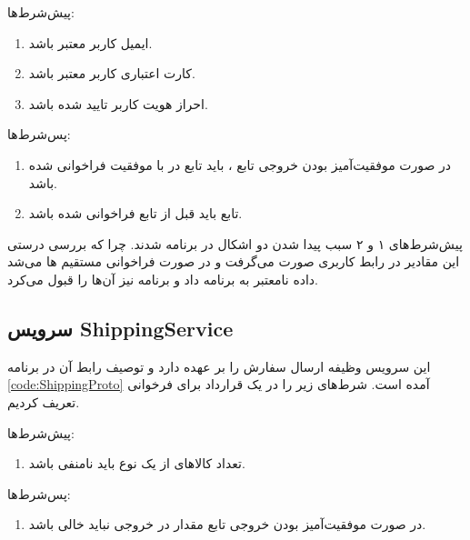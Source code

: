 پیش‌شرط‌ها:
\begin{enumerate}
\item
ایمیل کاربر معتبر باشد.
\item
کارت اعتباری کاربر معتبر باشد.
\item
احراز هویت کاربر تایید شده باشد.
\end{enumerate}

پس‌شرط‌ها:
\begin{enumerate}
\item
در صورت موفقیت‌آمیز بودن خروجی تابع
، باید تابع
در
با موفقیت فراخوانی شده باشد.
\item
تابع
باید قبل از تابع
فراخوانی شده باشد.
\end{enumerate}

پیش‌شرط‌های ۱ و ۲ سبب پیدا شدن دو اشکال در برنامه شدند. چرا که بررسی درستی این مقادیر در رابط کاربری صورت می‌گرفت و در صورت فراخوانی مستقیم
ها
می‌شد داده نامعتبر به برنامه داد و برنامه نیز آن‌ها را قبول می‌کرد.


\subsection{
سرویس ShippingService
}

\singlespacing
\begin{figure}
	\begin{LTR}
		
	\end{LTR}
\end{figure}
\doublespacing

این سرویس وظیفه ارسال سفارش را بر عهده دارد و توصیف رابط آن در برنامه
\ref{code:ShippingProto}
آمده است. شرط‌های زیر را در یک قرارداد برای فرخوانی
تعریف کردیم.

پیش‌شرط‌ها:
\begin{enumerate}
\item
تعداد کالاهای از یک نوع باید نامنفی باشد.
\end{enumerate}

پس‌شرط‌ها:
\begin{enumerate}
\item
در صورت موفقیت‌آمیز بودن خروجی تابع
مقدار
در خروجی نباید خالی باشد.
\end{enumerate}

